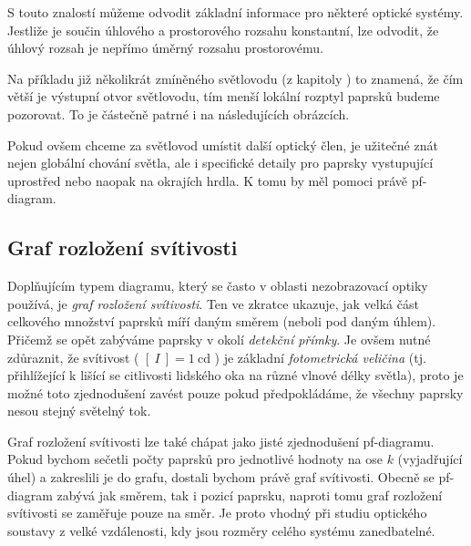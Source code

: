 S touto znalostí můžeme odvodit základní informace pro některé optické systémy. Jest\-li\-že je součin úhlového a prostorového rozsahu konstantní, lze odvodit, že úhlový rozsah je nepřímo úměrný rozsahu prostorovému. 

Na příkladu již několikrát zmíněného světlovodu (z kapitoly ) to znamená, že čím větší je výstupní otvor světlovodu, tím menší lokální rozptyl paprsků budeme pozorovat. To je částečně patrné i na následujících obrázcích.


Pokud ovšem chceme za světlovod umístit další optický člen, je užitečné znát nejen globální chování světla, ale i specifické detaily pro paprsky vystupující uprostřed nebo naopak na okrajích hrdla. K tomu by měl pomoci právě pf-diagram.


\subsection{Graf rozložení svítivosti}

Doplňujícím typem diagramu, který se často v oblasti nezobrazovací optiky používá, je \emph{graf rozložení svítivosti}. Ten ve zkratce ukazuje, jak velká část celkového množství paprsků míří daným směrem (neboli pod daným úhlem). Přičemž se opět zabýváme paprsky v okolí \emph{detekční přímky}. Je ovšem nutné zdůraznit, že svítivost ( $[\ I\ ] = 1\ \mathrm{cd}$ ) je základní \emph{fotometrická veličina} \parencite{fotometrie} (tj. přihlížející k lišící se citlivosti lidského oka na různé vlnové délky světla), proto je možné toto zjednodušení zavést pouze pokud předpokládáme, že všechny paprsky nesou stejný světelný tok.

Graf rozložení svítivosti lze také chápat jako jisté zjednodušení pf-diagramu. Pokud bychom sečetli počty paprsků pro jednotlivé hodnoty na ose $k$ (vyjadřující úhel) a zakreslili je do grafu, dostali bychom právě graf svítivosti. Obecně se pf-diagram zabývá jak směrem, tak i pozicí paprsku, naproti tomu graf rozložení svítivosti se zaměřuje pouze na směr. Je proto vhodný při studiu optického soustavy z velké vzdálenosti, kdy jsou rozměry celého systému zanedbatelné.

